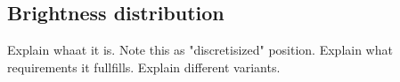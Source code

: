 \subsection{Brightness distribution}
Explain whaat it is. Note this as "discretisized" position.
Explain what requirements it fullfills.
Explain different variants.
